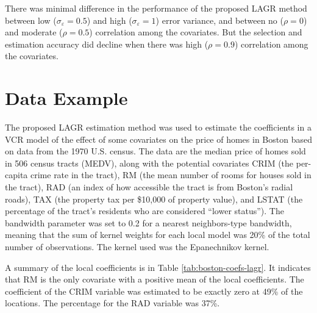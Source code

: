 \documentclass[12pt,english,authoryear, review]{article}\usepackage[]{graphicx}\usepackage[]{color}
\theoremstyle{plain}
\theoremstyle{plain}
\begin{document}
There was minimal difference in the performance of the proposed LAGR
method between low ($\sigma_{\varepsilon}=0.5$) and high ($\sigma_{\varepsilon}=1$)
error variance, and between no ($\rho=0$) and moderate ($\rho=0.5$)
correlation among the covariates. But the selection and estimation
accuracy did decline when there was high ($\rho=0.9$) correlation
among the covariates.


\section{Data Example\label{sec:example}}




The proposed LAGR estimation method was used to estimate the coefficients
in a VCR model of the effect of some covariates on the price of homes
in Boston based on data from the 1970 U.S. census\citep{Harrison-Rubinfeld-1978,Gilley-Pace-1996,Pace-Gilley-1997}.
The data are the median price of homes sold in 506 census tracts (MEDV),
along with the potential covariates CRIM (the per-capita crime rate
in the tract), RM (the mean number of rooms for houses sold in the
tract), RAD (an index of how accessible the tract is from Boston's
radial roads), TAX (the property tax per \$10,000 of property value),
and LSTAT (the percentage of the tract's residents who are considered
``lower status''). The bandwidth parameter was set to 0.2 for a
nearest neighbors-type bandwidth, meaning that the sum of kernel weights
for each local model was 20\% of the total number of observations.
The kernel used was the Epanechnikov kernel.

A summary of the local coefficients is in Table \ref{tab:boston-coefs-lagr}.
It indicates that RM is the only covariate with a positive mean of
the local coefficients. The coefficient of the CRIM variable was estimated
to be exactly zero at 49\%
of the locations. The percentage for the RAD variable was 37\%.
\end{document}

